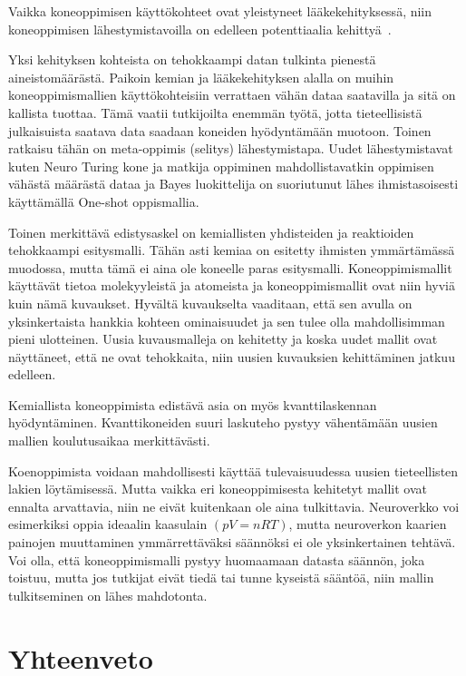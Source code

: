 \documentclass[finnish,twoside,censored,tkt,sw-line]{HYthesisML}
\begin{document}
Vaikka koneoppimisen käyttökohteet ovat yleistyneet lääkekehityksessä, niin koneoppimisen lähestymistavoilla on edelleen potenttiaalia kehittyä~\cite{ButlerKeithT2018Mlfm}.

Yksi kehityksen kohteista on tehokkaampi datan tulkinta pienestä aineistomäärästä.
Paikoin kemian ja lääkekehityksen alalla on muihin koneoppimismallien käyttökohteisiin verrattaen vähän dataa saatavilla ja sitä on kallista tuottaa.
Tämä vaatii tutkijoilta enemmän työtä, jotta tieteellisistä julkaisuista saatava data saadaan koneiden hyödyntämään muotoon.
Toinen ratkaisu tähän on meta-oppimis (selitys) lähestymistapa.
Uudet lähestymistavat kuten Neuro Turing kone ja matkija oppiminen mahdollistavatkin oppimisen vähästä määrästä dataa ja Bayes luokittelija on suoriutunut lähes ihmistasoisesti käyttämällä One-shot oppismallia.

Toinen merkittävä edistysaskel on kemiallisten yhdisteiden ja reaktioiden tehokkaampi esitysmalli.
Tähän asti kemiaa on esitetty ihmisten ymmärtämässä muodossa, mutta tämä ei aina ole koneelle paras esitysmalli.
Koneoppimismallit käyttävät tietoa molekyyleistä ja atomeista ja koneoppimismallit ovat niin hyviä kuin nämä kuvaukset.
Hyvältä kuvaukselta vaaditaan, että sen avulla on yksinkertaista hankkia kohteen ominaisuudet ja sen tulee olla mahdollisimman pieni ulotteinen.
Uusia kuvausmalleja on kehitetty ja koska uudet mallit ovat näyttäneet, että ne ovat tehokkaita, niin uusien kuvauksien kehittäminen jatkuu edelleen.

Kemiallista koneoppimista edistävä asia on myös kvanttilaskennan hyödyntäminen.
Kvanttikoneiden suuri laskuteho pystyy vähentämään uusien mallien koulutusaikaa merkittävästi.

Koenoppimista voidaan mahdollisesti käyttää tulevaisuudessa uusien tieteellisten lakien löytämisessä.
Mutta vaikka eri koneoppimisesta kehitetyt mallit ovat ennalta arvattavia, niin ne eivät kuitenkaan ole aina tulkittavia.
Neuroverkko voi esimerkiksi oppia ideaalin kaasulain \((pV=nRT)\), mutta neuroverkon kaarien painojen muuttaminen ymmärrettäväksi säännöksi ei ole yksinkertainen tehtävä.
Voi olla, että koneoppimismalli pystyy huomaamaan datasta säännön, joka toistuu, mutta jos tutkijat eivät tiedä tai tunne kyseistä sääntöä, niin mallin tulkitseminen on lähes mahdotonta.

\chapter{Yhteenveto}
\end{document}
